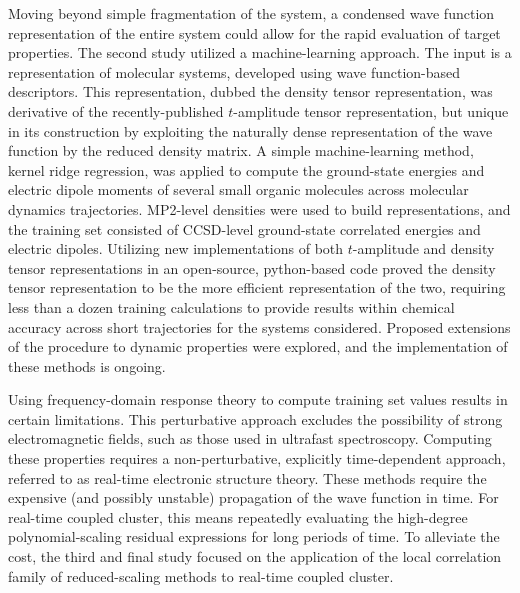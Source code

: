 Moving beyond simple fragmentation of the system, a condensed wave function
representation of the entire system could allow for the rapid evaluation of
target properties. The second study utilized a machine-learning approach. The
input is a representation of molecular systems, developed using wave
function-based descriptors. This representation, dubbed the density tensor
representation, was derivative of the recently-published $t$-amplitude tensor
representation, but unique in its construction by exploiting the naturally
dense representation of the wave function by the reduced density matrix. A
simple machine-learning method, kernel ridge regression, was applied to
compute the ground-state energies and electric dipole moments of several
small organic molecules across molecular dynamics trajectories. MP2-level
densities were used to build representations, and the training set
consisted of CCSD-level ground-state correlated energies and electric
dipoles. Utilizing new implementations of both $t$-amplitude and density
tensor representations in an open-source, python-based code proved the
density tensor representation to be the more efficient representation
of the two, requiring less than a dozen training calculations to provide
results within chemical accuracy across short trajectories for the systems
considered. Proposed extensions of the procedure to dynamic properties
were explored, and the implementation of these methods is ongoing.

Using frequency-domain response theory to compute training set values
results in certain limitations. This perturbative approach excludes the
possibility of strong electromagnetic fields, such as those used in ultrafast
spectroscopy. Computing these properties requires a non-perturbative,
explicitly time-dependent approach, referred to as real-time electronic
structure theory. These methods require the expensive (and possibly unstable)
propagation of the wave function in time. For real-time coupled cluster,
this means repeatedly evaluating the high-degree polynomial-scaling residual
expressions for long periods of time. To alleviate the cost, the third and
final study focused on the application of the local correlation family of
reduced-scaling methods to real-time coupled cluster.

